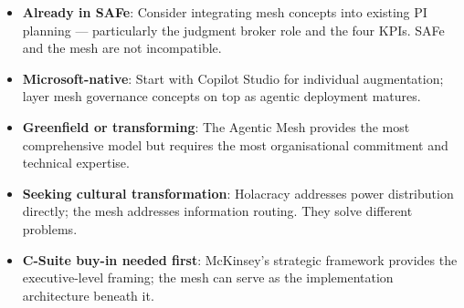 \begin{keyinsight}[title={Selection Guidance}]
\begin{itemize}
  \item \textbf{Already in SAFe}: Consider integrating mesh concepts into existing PI planning --- particularly the judgment broker role and the four KPIs. SAFe and the mesh are not incompatible.
  \item \textbf{Microsoft-native}: Start with Copilot Studio for individual augmentation; layer mesh governance concepts on top as agentic deployment matures.
  \item \textbf{Greenfield or transforming}: The Agentic Mesh provides the most comprehensive model but requires the most organisational commitment and technical expertise.
  \item \textbf{Seeking cultural transformation}: Holacracy addresses power distribution directly; the mesh addresses information routing. They solve different problems.
  \item \textbf{C-Suite buy-in needed first}: McKinsey's strategic framework provides the executive-level framing; the mesh can serve as the implementation architecture beneath it.
\end{itemize}
\end{keyinsight}
